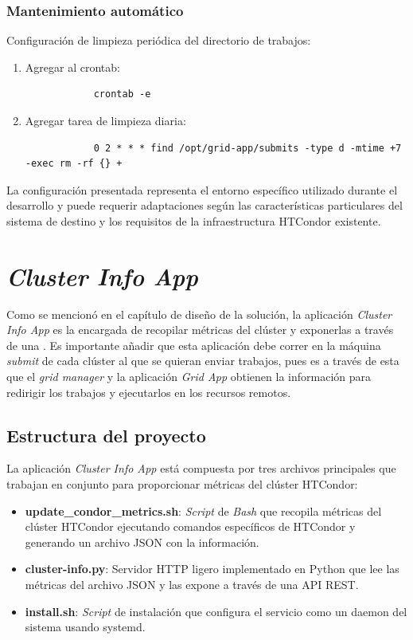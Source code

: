 \subsubsection{Mantenimiento automático}
\noindent

Configuración de limpieza periódica del directorio de trabajos:

\begin{enumerate}
	\item Agregar al crontab:
	      \begin{verbatim}
			crontab -e
		\end{verbatim}
	
	\item Agregar tarea de limpieza diaria:
	      \begin{verbatim}
			0 2 * * * find /opt/grid-app/submits -type d -mtime +7 -exec rm -rf {} +
		\end{verbatim}
\end{enumerate}

La configuración presentada representa el entorno específico utilizado durante el desarrollo y puede requerir adaptaciones según las características particulares del sistema de destino y los requisitos de la infraestructura HTCondor existente.

\section{\textit{Cluster Info App}}
\noindent

Como se mencionó en el capítulo de diseño de la solución, la aplicación \textit{Cluster Info App} es la encargada de recopilar métricas del clúster y exponerlas a través de una \API. Es importante añadir que esta aplicación debe correr en la máquina \textit{submit} de cada clúster al que se quieran enviar trabajos, pues es a través de esta que el \textit{grid manager} y la aplicación \textit{Grid App} obtienen la información para redirigir los trabajos y ejecutarlos en los recursos remotos.

\subsection{Estructura del proyecto}
\noindent
La aplicación \textit{Cluster Info App} está compuesta por tres archivos principales que trabajan en conjunto para proporcionar métricas del clúster HTCondor:

\begin{itemize}
	\item \textbf{update\_condor\_metrics.sh}: \textit{Script} de \textit{Bash} que recopila métricas del clúster HTCondor ejecutando comandos específicos de HTCondor y generando un archivo JSON con la información.
	\item \textbf{cluster-info.py}: Servidor HTTP ligero implementado en Python que lee las métricas del archivo JSON y las expone a través de una API REST.
	\item \textbf{install.sh}: \textit{Script} de instalación que configura el servicio como un daemon del sistema usando systemd.
\end{itemize}

